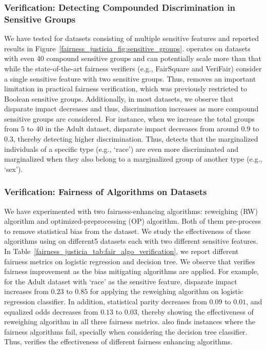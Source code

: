 \subsubsection{Verification: Detecting Compounded Discrimination in Sensitive Groups}
We have tested {\justicia} for datasets consisting of multiple sensitive features and reported results in Figure~\ref{fairness_justicia_fig:sensitive_groups}. {\justicia} operates on datasets with even 40 compound sensitive groups and can potentially scale more than that while the state-of-the-art fairness verifiers (e.g., FairSquare and VeriFair) consider a single sensitive feature with two sensitive groups. Thus, {\justicia} removes an important limitation in practical fairness verification, which was previously restricted to Boolean sensitive groups. Additionally, in most datasets, we observe that disparate impact decreases and thus, discrimination increases as more compound sensitive groups are considered. For instance, when we increase the total  groups from $ 5 $ to $ 40 $ in the Adult dataset, disparate impact decreases from around $ 0.9 $ to $ 0.3 $, thereby detecting higher discrimination. Thus, {\justicia} detects that the marginalized individuals of a specific type (e.g., `race')  are even more discriminated and marginalized when they also belong to a marginalized group of another type (e.g., `sex').





\subsubsection{Verification: Fairness of Algorithms on Datasets}
We have experimented with two fairness-enhancing algorithms: reweighing (RW) algorithm and optimized-preprocessing (OP) algorithm. Both of them pre-process to remove statistical bias from the dataset. We study the effectiveness of these algorithms using {\justicia} on different5 datasets each with two different sensitive features.  
In Table~\ref{fairness_justicia_tab:fair_algo_verification}, we report different fairness metrics on logistic regression and decision tree. We observe that {\justicia} verifies fairness improvement as the bias mitigating algorithms are applied.  For example, for the Adult dataset with `race' as the sensitive feature, disparate impact increases from $ 0.23 $ to $ 0.85 $ for applying the reweighing algorithm on logistic regression classifier. In addition, statistical parity decreases from $ 0.09 $ to $ 0.01 $, and equalized odds decreases from $ 0.13 $ to $ 0.03 $, thereby showing the effectiveness of reweighing algorithm in all three fairness metrics. 
{\justicia} also finds instances where the fairness algorithms fail, specially when considering the decision tree classifier. 
Thus, {\justicia} verifies the effectiveness of different fairness enhancing algorithms.

